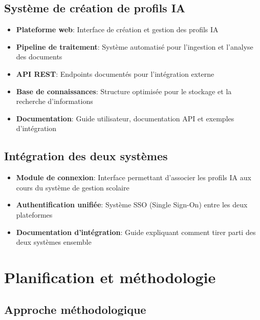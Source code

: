 \subsection{Système de création de profils IA}

\begin{itemize}
  \item \textbf{Plateforme web}: Interface de création et gestion des profils IA
  
  \item \textbf{Pipeline de traitement}: Système automatisé pour l'ingestion et l'analyse des documents
  
  \item \textbf{API REST}: Endpoints documentés pour l'intégration externe
  
  \item \textbf{Base de connaissances}: Structure optimisée pour le stockage et la recherche d'informations
  
  \item \textbf{Documentation}: Guide utilisateur, documentation API et exemples d'intégration
\end{itemize}

\subsection{Intégration des deux systèmes}

\begin{itemize}
  \item \textbf{Module de connexion}: Interface permettant d'associer les profils IA aux cours du système de gestion scolaire
  
  \item \textbf{Authentification unifiée}: Système SSO (Single Sign-On) entre les deux plateformes
  
  \item \textbf{Documentation d'intégration}: Guide expliquant comment tirer parti des deux systèmes ensemble
\end{itemize}

\section{Planification et méthodologie}

\subsection{Approche méthodologique}

